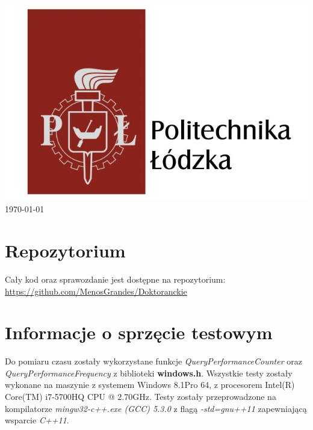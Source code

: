 \begin{titlepage}
\includegraphics[scale=0.36]{logo.png}\\[1.3cm]
 


{\large \today}\\[5cm] %

\vfill %

\end{titlepage}






 \tableofcontents 
 \section{Repozytorium}
 Cały kod oraz sprawozdanie jest dostępne na repozytorium:
 \url{https://github.com/MenosGrandes/Doktoranckie}
\section{Informacje o sprzęcie testowym}
Do pomiaru czasu zostały wykorzystane funkcje \textit{QueryPerformanceCounter} oraz \textit{QueryPerformanceFrequency} z biblioteki \textbf{windows.h}. Wszystkie testy zostały wykonane na maszynie z systemem Windows 8.1Pro 64, z procesorem Intel(R) Core(TM) i7-5700HQ CPU @ 2.70GHz. Testy zostały przeprowadzone na kompilatorze \textit{mingw32-c++.exe (GCC) 5.3.0} z flagą \textit{-std=gnu++11} zapewniającą wsparcie \textit{C++11}.


